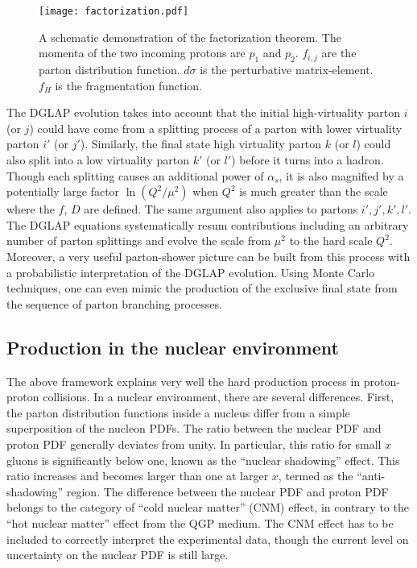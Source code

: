 \begin{figure}
\singlespacing
\centering
\texttt{[image: factorization.pdf]}
\caption[A schematic demonstration of the factorization theorem. The]{A schematic demonstration of the factorization theorem. The momenta of the two incoming protons are $p_1$ and $p_2$. $f_{i,j}$ are the parton distribution function. $d\sigma$ is the perturbative matrix-element. $f_H$ is the fragmentation function.}
\label{fig:factorization}
\end{figure}

The DGLAP evolution takes into account that the initial high-virtuality parton $i$ (or $j$) could have come from a splitting process of a parton with lower virtuality parton $i'$ (or $j'$).
Similarly, the final state high virtuality parton $k$ (or $l$) could also split into a low virtuality parton $k'$ (or $l'$) before it turns into a hadron.
Though each splitting causes an additional power of $\alpha_s$, it is also magnified by a potentially large factor $\ln (Q^2/\mu^2)$ when $Q^2$ is much greater than the scale where the $f$, $D$ are defined.
The same argument also applies to partons $i', j', k', l'$. 
The DGLAP equations systematically resum contributions including an arbitrary number of parton splittings and evolve the scale from $\mu^2$ to the hard scale $Q^2$.
Moreover, a very useful parton-shower picture can be built from this process with a probabilistic interpretation of the DGLAP evolution. Using Monte Carlo techniques, one can even mimic the production of the exclusive final state from the sequence of parton branching processes.

\subsection{Production in the nuclear environment}
The above framework explains very well the hard production process in proton-proton collisions.
In a nuclear environment, there are several differences.
First, the parton distribution functions inside a nucleus differ from a simple superposition of the nucleon PDFs.
The ratio between the nuclear PDF and proton PDF generally deviates from unity.
In particular, this ratio for small $x$ gluons is significantly below one, known as the ``nuclear shadowing'' effect. 
This ratio increases and becomes larger than one at larger $x$, termed as the ``anti-shadowing'' region.
The difference between the nuclear PDF and proton PDF belongs to the category of ``cold nuclear matter'' (CNM) effect, in contrary to the ``hot nuclear matter'' effect from the QGP medium.
The CNM effect has to be included to correctly interpret the experimental data, though the current level on uncertainty on the nuclear PDF is still large.

